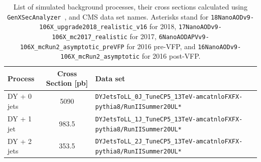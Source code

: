 \begin{table}[htb!]
	\centering
	\caption[List of simulated background processes, their cross sections calculated using \texttt{GenXSecAnalyzer}~\cite{genxsecana}, and CMS data set names.]
	{List of simulated background processes, their cross sections calculated using \texttt{GenXSecAnalyzer}~\cite{genxsecana}, and CMS data set names. Asterisks stand for \texttt{18NanoAODv9-106X\_upgrade2018\_realistic\_v16} for 2018, \texttt{17NanoAODv9-106X\_mc2017\_realistic} for 2017, \texttt{6NanoAODAPVv9-106X\_mcRun2\_asymptotic\_preVFP} for 2016 pre-VFP, and \texttt{16NanoAODv9-106X\_mcRun2\_asymptotic} for 2016 post-VFP.}
	\label{tab:mcsamples}
	\begin{tabular}{l c l}\hline
		Process & Cross Section [pb] & Data set\\
		\hline
		DY + 0 jets & 5090 & \scriptsize\texttt{DYJetsToLL\_0J\_TuneCP5\_13TeV-amcatnloFXFX-pythia8/RunIISummer20UL*}\\
		DY + 1 jet & 983.5 & \scriptsize\texttt{DYJetsToLL\_1J\_TuneCP5\_13TeV-amcatnloFXFX-pythia8/RunIISummer20UL*}\\
		DY + 2 jets & 353.5 & \scriptsize\texttt{DYJetsToLL\_2J\_TuneCP5\_13TeV-amcatnloFXFX-pythia8/RunIISummer20UL*}\\
		\hline
	\end{tabular}
	
\end{table}

